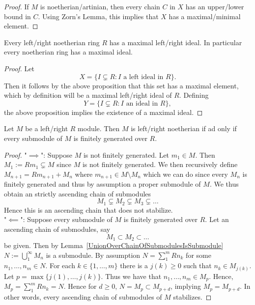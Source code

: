 \begin{proof}
    If $M$ is noetherian/artinian, then every chain $C$ in $X$ has an upper/lower bound in $C$. Using Zorn's Lemma, this implies that $X$ has a maximal/minimal element.  
\end{proof}
\begin{corollary}
    Every left/right noetherian ring $R$ has a maximal left/right ideal. In particular every noetherian ring has a maximal ideal. 
\end{corollary}
\begin{proof}
    Let 
    $$X = \{ I \subsetneq R : I \text{ a left ideal in } R\}.$$
    Then it follows by the above proposition that this set has a maximal element, which by definition will be a maximal left/right ideal of $R$. 
    Defining 
    $$Y = \{I \subsetneq R : I \text{ an ideal in } R\},$$
    the above proposition implies the existence of a maximal ideal.
\end{proof}
\begin{theorem}\label{NoetherianIffEverySubmoduleFinitelyGenerated}
    Let $M$ be a left/right $R$ module. Then $M$ is left/right noetherian if ad only if every submodule of $M$ is finitely generated over $R$.
\end{theorem}
\begin{proof}
    "$\implies$": Suppose $M$ is not finitely generated. Let $m_1\in M$. Then $M_1:= Rm_1 \subsetneq M$ since $M$ is not finitely generated. We then recursively define $M_{n+1} = Rm_{n+1} +M_n$ where $m_{n+1}\in M\setminus M_n$ which we can do since every $M_n$ is finitely generated and thus by assumption a proper submodule of $M$. We thus obtain an strictly ascending chain of submodules
    $$M_1\subsetneq M_2\subsetneq M_3\subsetneq \dots$$
    Hence this is an ascending chain that does not stabilize.\\
    "$\impliedby$": Suppose every submodule of $M$ is finitely generated over $R$. Let an ascending chain of submodules, say
    $$M_1\subset M_2\subset \dots$$
    be given. Then by Lemma~\ref{UnionOverChainOfSubmodulesIsSubmodule} $N:=\bigcup_{1}^\infty M_n$ is a submodule. 
    By assumption $N = \sum_1^m Rn_k$ for some $n_1,\dots,n_m \in N$. For each $k\in \{1,\dots,m\}$ there is a $j(k)\geq 0$ such that $n_k\in M_{j(k)}$. Let 
    $p = \max\{j(1),\dots,j(k)\}$. Thus we have that $n_1,\dots, n_m\in M_p$. Hence, $M_p = \sum_1^m Rn_k = N$. Hence for $d\geq 0$, $N=M_p \subset M_{p+d} $, implying $M_p = M_{p+d}$. In other words, every ascending chain of submodules of $M$ stabilizes.
\end{proof}
